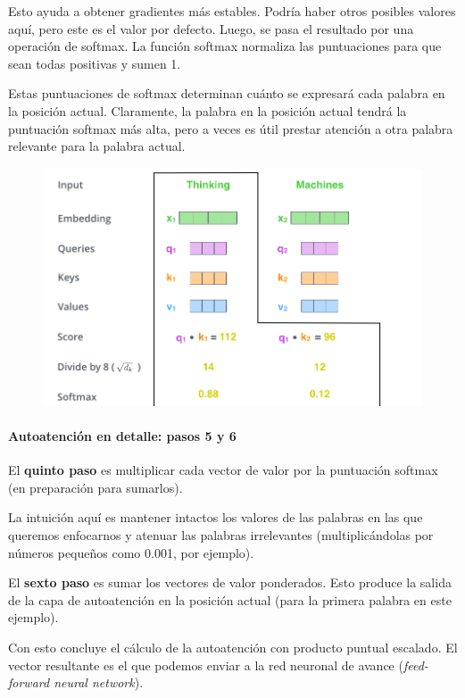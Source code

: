 Esto ayuda a obtener gradientes más estables. Podría haber otros posibles valores aquí, pero este es el valor por defecto. Luego, se pasa el resultado por una operación de softmax. La función softmax normaliza las puntuaciones para que sean todas positivas y sumen 1.

Estas puntuaciones de softmax determinan cuánto se expresará cada palabra en la posición actual. Claramente, la palabra en la posición actual tendrá la puntuación softmax más alta, pero a veces es útil prestar atención a otra palabra relevante para la palabra actual.

\begin{figure}[h]
  \centering
  \includegraphics[scale=0.35]{pics/self-attention_softmax.png}
\end{figure}

\paragraph{Autoatención en detalle: pasos 5 y 6}

El \textbf{quinto paso} es multiplicar cada vector de valor por la puntuación softmax (en preparación para sumarlos).

La intuición aquí es mantener intactos los valores de las palabras en las que queremos enfocarnos y atenuar las palabras irrelevantes (multiplicándolas por números pequeños como 0.001, por ejemplo).

El \textbf{sexto paso} es sumar los vectores de valor ponderados. Esto produce la salida de la capa de autoatención en la posición actual (para la primera palabra en este ejemplo).

Con esto concluye el cálculo de la autoatención con producto puntual escalado. El vector resultante es el que podemos enviar a la red neuronal de avance (\textit{feed-forward neural network}).

